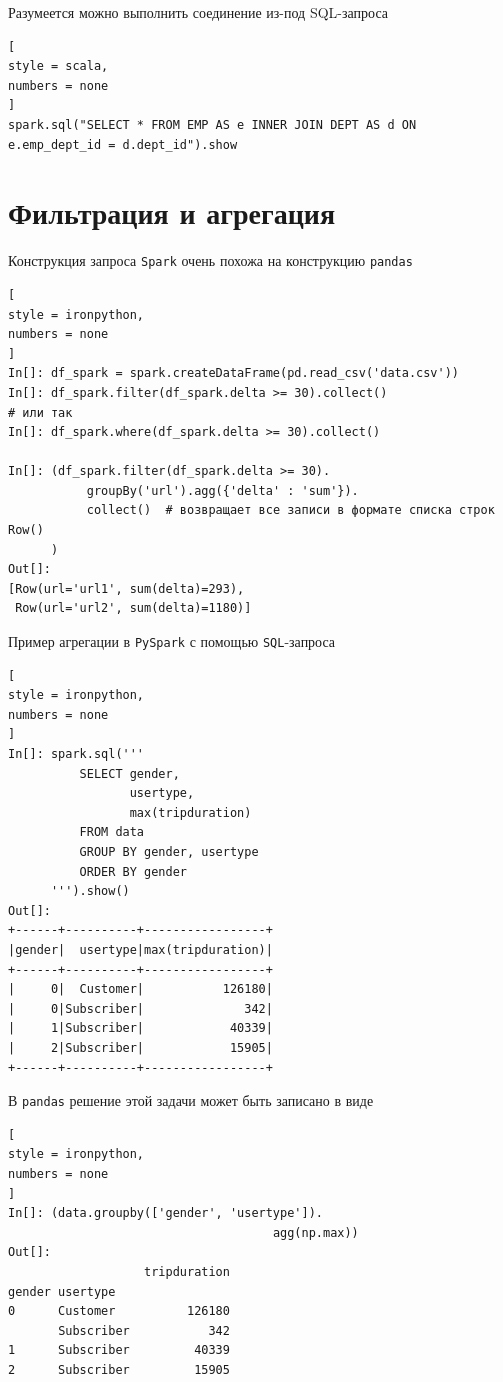 \documentclass[%
	11pt,
	a4paper,
	utf8,
		]{article}
\begin{document}
Разумеется можно выполнить соединение из-под SQL-запроса
\begin{lstlisting}[
style = scala,
numbers = none	
]
spark.sql("SELECT * FROM EMP AS e INNER JOIN DEPT AS d ON e.emp_dept_id = d.dept_id").show
\end{lstlisting}



\section{Фильтрация и агрегация}

Конструкция запроса \texttt{Spark} очень похожа на конструкцию \texttt{pandas}

\begin{lstlisting}[
style = ironpython,
numbers = none
]
In[]: df_spark = spark.createDataFrame(pd.read_csv('data.csv'))
In[]: df_spark.filter(df_spark.delta >= 30).collect()
# или так
In[]: df_spark.where(df_spark.delta >= 30).collect()

In[]: (df_spark.filter(df_spark.delta >= 30).
           groupBy('url').agg({'delta' : 'sum'}).
           collect()  # возвращает все записи в формате списка строк Row()
      )
Out[]:
[Row(url='url1', sum(delta)=293),
 Row(url='url2', sum(delta)=1180)]
\end{lstlisting}


\begin{minipage}[t]{0.45\textwidth}
Пример агрегации в \texttt{PySpark} с помощью \texttt{SQL}-запроса

\begin{lstlisting}[
style = ironpython,
numbers = none
]
In[]: spark.sql('''
          SELECT gender,
                 usertype,
                 max(tripduration)
          FROM data
          GROUP BY gender, usertype
          ORDER BY gender
      ''').show()
Out[]:
+------+----------+-----------------+
|gender|  usertype|max(tripduration)|
+------+----------+-----------------+
|     0|  Customer|           126180|
|     0|Subscriber|              342|
|     1|Subscriber|            40339|
|     2|Subscriber|            15905|
+------+----------+-----------------+
\end{lstlisting}
\end{minipage}
\hspace*{5mm}
\begin{minipage}[t]{0.48\textwidth}

В \texttt{pandas} решение этой задачи может быть записано в виде
\begin{lstlisting}[
style = ironpython,
numbers = none
]
In[]: (data.groupby(['gender', 'usertype']).
                                     agg(np.max))
Out[]:
                   tripduration
gender usertype                
0      Customer          126180
       Subscriber           342
1      Subscriber         40339
2      Subscriber         15905
\end{lstlisting}
\end{minipage}
\end{document}
